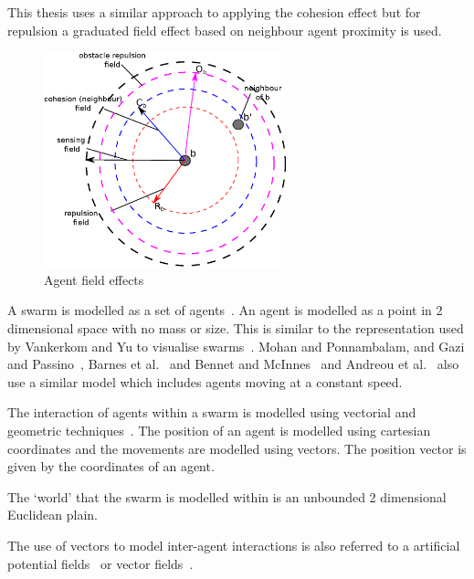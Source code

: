 This thesis uses a similar approach to applying the cohesion effect but for repulsion a graduated field effect based on neighbour agent proximity is used.

\begin{figure}[H]
\begin{center}
\includegraphics[width=7cm]{CHAPTER-2/figures/FieldEffects}
\end{center}
\caption{Agent field effects\label{methods:FieldEffects}}
\end{figure}

A swarm is modelled as a set of agents~\cite{MIN:07, VY:04}. An agent is modelled as a point in 2 dimensional space with no mass or size. This is similar to the representation used by Vankerkom and Yu to visualise swarms~\cite{VY:04}. Mohan and Ponnambalam, and Gazi and Passino~\cite{VY:04, GP:04}, Barnes et al.~\cite{BAF:06, BAFVM:06, BFV:07} and Bennet and McInnes~\cite{BM:09} and Andreou et al.~\cite{APZDAMC:09} also use a similar model which includes agents moving at a constant speed.

The interaction of agents within a swarm is modelled using vectorial and geometric techniques~\cite{HER:11, BAF:06}. The position of an agent is modelled using cartesian coordinates and the movements are modelled using vectors. The position vector is given by the coordinates of an agent.

The `world' that the swarm is modelled within is an unbounded 2 dimensional Euclidean plain.  

The use of vectors to model inter-agent interactions is also referred to a artificial potential fields~\cite{VG:05, XJYYH:10, SW:03, BAF:06, BAFVM:06, BFV:07, BM:09, HC:09} or vector fields~\cite{YH:14, GKF:13, PZ:13}. 


